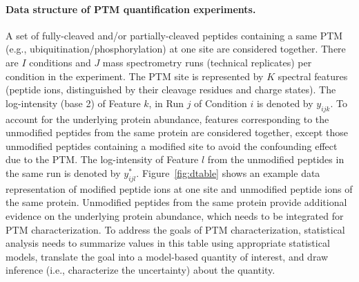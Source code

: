\documentclass{mcp}
\def\sfigref#1{{Figure~\ref{#1}}}
\begin{document}
\paragraph{Data structure of PTM quantification experiments.}
A set of fully-cleaved and/or partially-cleaved peptides containing a same PTM (e.g., ubiquitination/phosphorylation) at one site are considered together. There are $I$ conditions and $J$ mass spectrometry runs (technical replicates) per condition in the experiment. The PTM site is represented by $K$ spectral features (peptide ions, distinguished by their cleavage residues and charge states). The log-intensity (base 2) of Feature $k$, in Run $j$ of Condition $i$ is denoted by $y_{ijk}$. To account for the underlying protein abundance, features corresponding to the unmodified peptides from the same protein are considered together, except those unmodified peptides containing a modified site to avoid the confounding effect due to the PTM. The log-intensity of Feature $l$ from the unmodified peptides in the same run is denoted by $y_{ijl}^{\ast}$. \sfigref{fig:dtable} shows an example data representation of modified peptide ions at one site and unmodified peptide ions of the same protein. Unmodified peptides from the same protein provide additional evidence on the underlying protein abundance, which needs to be integrated for PTM characterization. To address the goals of PTM characterization, statistical analysis needs to summarize values in this table using appropriate statistical models, translate the goal into a model-based quantity of interest, and draw inference (i.e., characterize the uncertainty) about the quantity. 
\end{document}
